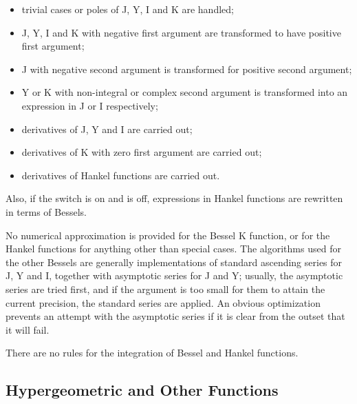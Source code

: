 \begin{itemize}
\item trivial cases or poles of J, Y, I and K are handled;
\item J, Y, I and K with negative first argument are transformed to have
positive first argument;
\item J with negative second argument is transformed for positive second
argument;
\item Y or K with non-integral or complex second argument is transformed
into an expression in J or I respectively;
\item derivatives of J, Y and I are carried out;
\item derivatives of K with zero first argument are carried out;
\item derivatives of Hankel functions are carried out.
\end{itemize}
Also, if the  switch is on and  is off,
expressions in Hankel functions are rewritten in terms of Bessels.

No numerical approximation is provided for the Bessel K function, or for
the Hankel functions for anything other than special cases.  The
algorithms used for the other Bessels are generally implementations of
standard ascending series for J, Y and I, together with asymptotic
series for J and Y; usually, the asymptotic series are tried first, and
if the argument is too small for them to attain the current precision,
the standard series are applied.  An obvious optimization prevents an
attempt with the asymptotic series if it is clear from the outset that
it will fail.

There are no rules for the integration of Bessel and Hankel functions.


\subsection{Hypergeometric and Other Functions}


